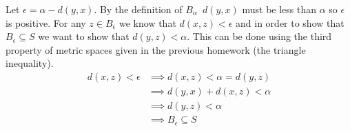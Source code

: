 \documentclass[paper=a4, fontsize=11pt]{jhwhw} %
\begin{document}
Let $\epsilon = \alpha - d(y, x)$. By the definition of $B_\alpha$\, $d(y, x)$ must be less than $\alpha$ so $\epsilon$ is positive. For any $z\in B_\epsilon$ we know that $d(x, z) < \epsilon$ and in order to show that $B_\epsilon \subseteq S$ we want to show that $d(y, z) < \alpha$. This can be done using the third property of metric spaces given in the previous homework (the triangle inequality).
\begin{align}
    d(x, z) < \epsilon &\implies d(x, z) < \alpha = d(y, z)\\
                       &\implies d(y, x) + d(x, z) < \alpha\\
                       &\implies d(y, z) < \alpha\\
                       &\implies B_\epsilon \subseteq S
\end{align}
\end{document}
